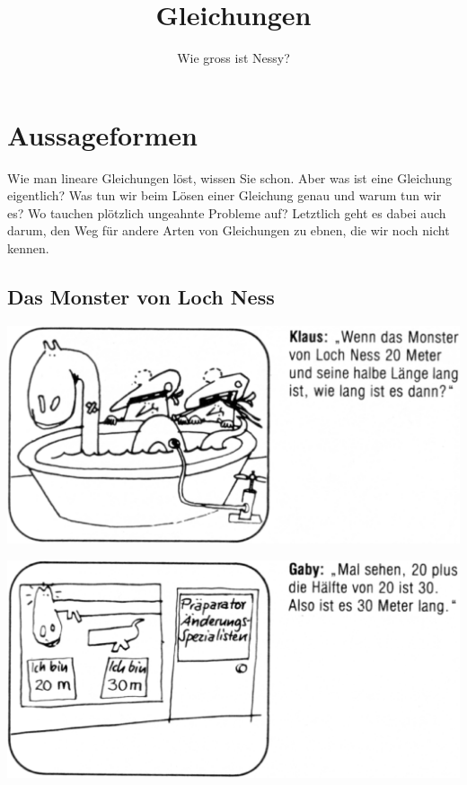 \documentclass[%
11pt,%
twoside,%
titlepage,%
german,%
]{scrartcl}
\title{Gleichungen}
\subtitle{Wie gross ist Nessy?}
\author{}
\date{}
\begin{document}
\maketitle
\tableofcontents
\cleardoublepage

\section{Aussageformen}
Wie man lineare Gleichungen l\"ost, wissen Sie schon. Aber was ist eine Gleichung eigentlich? Was tun wir beim L\"osen einer Gleichung genau und warum tun wir es? Wo tauchen pl\"otzlich ungeahnte Probleme auf? Letztlich geht es dabei auch darum, den Weg f\"ur andere Arten von Gleichungen zu ebnen, die wir noch nicht kennen.
\label{lingl}

\subsection{Das Monster von Loch Ness}
\label{lingl:lochness}

\medskip
\noindent\includegraphics[width=\columnwidth,bb=14 14 960 469]{pictures/lochness1t.eps}

\medskip
\noindent\includegraphics[width=\columnwidth,bb=14 14 960 470]{pictures/lochness2t.eps}
\end{document}
